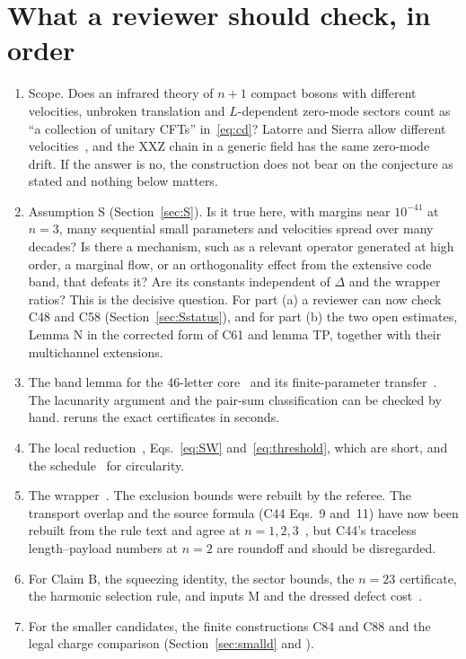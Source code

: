 \documentclass[11pt]{article}
\theoremstyle{definition}
\begin{document}
\section{What a reviewer should check, in order}

\begin{enumerate}
\item Scope. Does an infrared theory of $n+1$ compact bosons with different velocities, unbroken translation and $L$-dependent zero-mode sectors count as ``a collection of unitary CFTs'' in~\eqref{eq:cd}? Latorre and Sierra allow different velocities~\cite{LS}, and the XXZ chain in a generic field has the same zero-mode drift. If the answer is no, the construction does not bear on the conjecture as stated and nothing below matters.
\item Assumption S (Section~\ref{sec:S}). Is it true here, with margins near $10^{-41}$ at $n=3$, many sequential small parameters and velocities spread over many decades? Is there a mechanism, such as a relevant operator generated at high order, a marginal flow, or an orthogonality effect from the extensive code band, that defeats it? Are its constants independent of $\Delta$ and the wrapper ratios? This is the decisive question. For part (a) a reviewer can now check C48 and C58 (Section~\ref{sec:Sstatus}), and for part (b) the two open estimates, Lemma N in the corrected form of C61 and lemma TP, together with their multichannel extensions.
\item The band lemma for the 46-letter core~\cite[PROOFS \S2--5]{C39} and its finite-parameter transfer~\cite[PROOF]{C42}. The lacunarity argument and the pair-sum classification can be checked by hand.  reruns the exact certificates in seconds.
\item The local reduction~\cite[PROOF \S3--4]{C45}, Eqs.~\eqref{eq:SW} and~\eqref{eq:threshold}, which are short, and the schedule~\cite[PROOF \S8]{C45} for circularity.
\item The wrapper~\cite[PROOFS]{C44}. The exclusion bounds were rebuilt by the referee. The transport overlap and the source formula (C44 Eqs.~9 and~11) have now been rebuilt from the rule text and agree at $n=1,2,3$~\cite{verC44}, but C44's traceless length--payload numbers at $n=2$ are roundoff and should be disregarded.
\item For Claim B, the squeezing identity, the sector bounds, the $n=23$ certificate, the harmonic selection rule, and inputs M and the dressed defect cost~\cite{campaign,audit}.
\item For the smaller candidates, the finite constructions C84 and C88 and the legal charge comparison (Section~\ref{sec:smalld} and ).
\end{enumerate}
\end{document}

